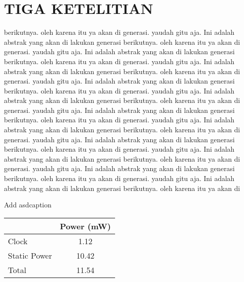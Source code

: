 \section{TIGA KETELITIAN}
berikutnya. oleh karena itu ya akan di generasi. yaudah gitu aja. Ini adalah abstrak yang akan di lakukan generasi berikutnya. oleh karena itu ya akan di generasi. yaudah gitu aja. Ini adalah abstrak yang akan di lakukan generasi berikutnya. oleh karena itu ya akan di generasi. yaudah gitu aja. Ini adalah abstrak yang akan di lakukan generasi berikutnya. oleh karena itu ya akan di generasi. yaudah gitu aja. Ini adalah abstrak yang akan di lakukan generasi berikutnya. oleh karena itu ya akan di generasi. yaudah gitu aja. Ini adalah abstrak yang akan di lakukan generasi berikutnya. oleh karena itu ya akan di generasi. yaudah gitu aja. Ini adalah abstrak yang akan di lakukan generasi berikutnya. oleh karena itu ya akan di generasi. yaudah gitu aja. Ini adalah abstrak yang akan di lakukan generasi berikutnya. oleh karena itu ya akan di generasi. yaudah gitu aja. Ini adalah abstrak yang akan di lakukan generasi berikutnya. oleh karena itu ya akan di generasi. yaudah gitu aja. Ini adalah abstrak yang akan di lakukan generasi berikutnya. oleh karena itu ya akan di generasi. yaudah gitu aja. Ini adalah abstrak yang akan di lakukan generasi berikutnya. oleh karena itu ya akan di generasi. yaudah gitu aja. Ini adalah abstrak yang akan di lakukan generasi berikutnya. oleh karena itu ya akan di

\begin{tablehere}
	\centering
	\caption{Add asdcaption}
	\begin{tabular}{|l|c|}
		\hline
		\rowcolor[rgb]{ .906,  .902,  .902} \multicolumn{1}{|c|}{Unprotected} & Power (mW) \bigstrut\\
		\hline
		Clock & 1.12 \bigstrut\\
		\hline
		Static Power & 10.42 \bigstrut\\
		\hline
		Total & 11.54 \bigstrut\\
		\hline
	\end{tabular}%
	\label{tab:addlaabel}%
\end{tablehere}%


